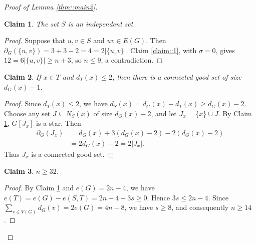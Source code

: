 \documentclass[11pt]{article}
\newtheorem{claim}{Claim}
\theoremstyle{definition}
\begin{document}
\begin{proof}[Proof of Lemma \ref{thm::main2}]
  \begin{claim}\label{claim::2}
    The set $S$ is an independent set.
  \end{claim}

  \begin{proof}
    Suppose that $u,v\in S$ and $uv\in E(G)$. Then $\partial_G(\{u,v\})=3+3-2=4=2|\{u,v\}|$. Claim \ref{claim::1}, with $\sigma=0$, gives $12=6|\{u,v\}|\geq n+3$,
    so $n\leq 9$, a contradiction.
  \end{proof}


  \begin{claim}\label{claim::3}
    If $x\in T$ and $d_T(x)\leq 2$, then there is a connected good set of size $d_G(x)-1$.
  \end{claim}

  \begin{proof}
    Since $d_T(x)\leq 2$, we have $d_S(x)=d_G(x)-d_T(x)\geq d_G(x)-2$. Choose any set $J\subseteq N_S(x)$ of size $d_G(x)-2$, and let $J_x=\{x\}\cup J$. By Claim \ref{claim::2}, $G[J_x]$ is a star. Then
    \begin{equation*}
      \begin{aligned}
        \partial_G(J_x)
         & =d_G(x)+3(d_G(x)-2)-2(d_G(x)-2) \\
         & =2d_G(x)-2
        =2|J_x|.
      \end{aligned}
    \end{equation*}
    Thus $J_x$ is a connected good set.
  \end{proof}



  \begin{claim}\label{claim::4}
    $n \geq 32$.
  \end{claim}

  \begin{proof}
    By Claim \ref{claim::2} and $e(G)=2n-4$, we have $e(T)=e(G)-e(S,T)=2n-4-3s\geq 0$. Hence $3s\leq 2n-4$. Since $\sum_{v\in V(G)}d_G(v)=2e(G)=4n-8$, we have $s\geq 8$, and consequently $n\geq 14$.


\end{proof}
\end{proof}
\end{document}
